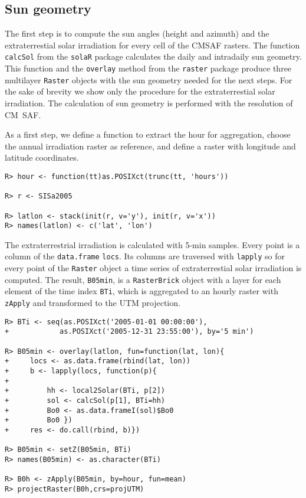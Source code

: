 \documentclass[authoryear, sort&compress]{elsarticle}
\begin{document}
\subsection{Sun geometry}
\label{sec-1-3}

The first step is to compute the sun angles (height and azimuth)
and the extraterrestial solar irradiation for every cell of the
CMSAF rasters. The function \texttt{calcSol} from the \texttt{solaR}
package calculates the daily and intradaily sun geometry. This
function and the \texttt{overlay} method from the \texttt{raster}
package produce three multilayer \texttt{Raster} objects with the
sun geometry needed for the next steps. For the sake of brevity we
show only the procedure for the extraterrestial solar
irradiation. The calculation of sun geometry is performed with the
resolution of CM~SAF.

As a first step, we define a function to extract the hour for
aggregation, choose the annual irradiation raster as reference, and
define a raster with longitude and latitude coordinates.
\lstset{language=R,numbers=none}
\begin{lstlisting} 
R> hour <- function(tt)as.POSIXct(trunc(tt, 'hours'))

R> r <- SISa2005

R> latlon <- stack(init(r, v='y'), init(r, v='x'))
R> names(latlon) <- c('lat', 'lon')
\end{lstlisting}


The extraterrestrial irradiation is calculated with 5-min
samples. Every point is a column of the \texttt{data.frame}
\texttt{locs}. Its columns are traversed with \texttt{lapply} so for
every point of the \texttt{Raster} object a time series of
extraterrestial solar irradiation is computed.  The result,
\texttt{B05min}, is a \texttt{RasterBrick} object with a layer for
each element of the time index \texttt{BTi}, which is aggregated to
an hourly raster with \texttt{zApply} and transformed to the UTM
projection.

\lstset{language=R,numbers=none}
\begin{lstlisting} 
R> BTi <- seq(as.POSIXct('2005-01-01 00:00:00'),
+            as.POSIXct('2005-12-31 23:55:00'), by='5 min')

R> B05min <- overlay(latlon, fun=function(lat, lon){
+     locs <- as.data.frame(rbind(lat, lon))
+     b <- lapply(locs, function(p){
+ 
+         hh <- local2Solar(BTi, p[2])
+         sol <- calcSol(p[1], BTi=hh)
+         Bo0 <- as.data.frameI(sol)$Bo0
+         Bo0 })
+     res <- do.call(rbind, b)})

R> B05min <- setZ(B05min, BTi)
R> names(B05min) <- as.character(BTi)

R> B0h <- zApply(B05min, by=hour, fun=mean)
R> projectRaster(B0h,crs=projUTM)
\end{lstlisting}
\end{document}

